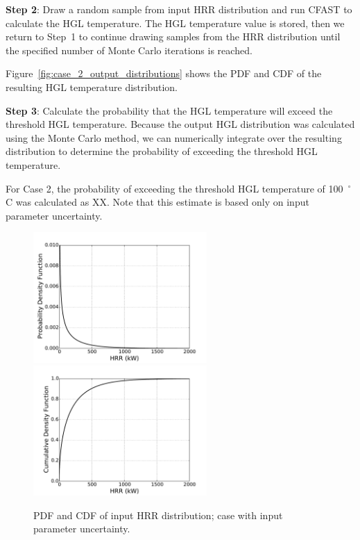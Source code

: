 \documentclass[12pt]{article}
\begin{document}
\textbf{Step 2}: Draw a random sample from input HRR distribution and run CFAST to calculate the HGL temperature. The HGL temperature value is stored, then we return to Step~1 to continue drawing samples from the HRR distribution until the specified number of Monte Carlo iterations is reached.

Figure~\ref{fig:case_2_output_distributions} shows the PDF and CDF of the resulting HGL temperature distribution.

\textbf{Step 3}: Calculate the probability that the HGL temperature will exceed the threshold HGL temperature. Because the output HGL distribution was calculated using the Monte Carlo method, we can numerically integrate over the resulting distribution to determine the probability of exceeding the threshold HGL temperature.

For Case 2, the probability of exceeding the threshold HGL temperature of 100~$^\circ$C was calculated as XX. Note that this estimate is based only on input parameter uncertainty.


\clearpage


\begin{figure}[p]
\includegraphics[width=2.6in]{Figures/input_PDF}
\includegraphics[width=2.6in]{Figures/input_CDF}
\caption{PDF and CDF of input HRR distribution; case with input parameter uncertainty.}
\label{fig:case_2_input_distributions}
\end{figure}
\end{document}
